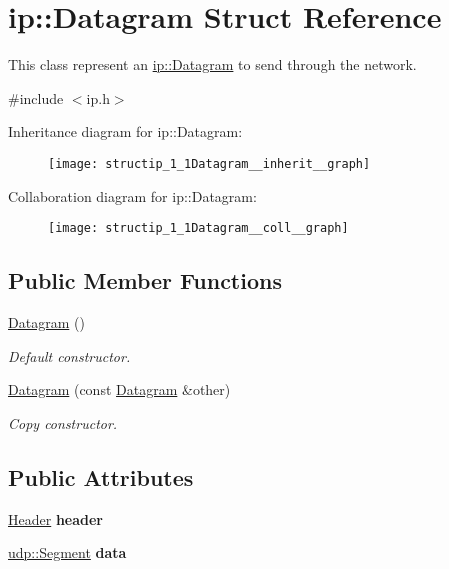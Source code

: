 \hypertarget{structip_1_1Datagram}{}\section{ip\+:\+:Datagram Struct Reference}
\label{structip_1_1Datagram}


This class represent an \hyperlink{structip_1_1Datagram}{ip\+::\+Datagram} to send through the network.  




{\ttfamily \#include $<$ip.\+h$>$}



Inheritance diagram for ip\+:\+:Datagram\+:\nopagebreak
\begin{figure}[H]
\begin{center}
\leavevmode
\texttt{[image: structip\_1\_1Datagram\_\_inherit\_\_graph]}
\end{center}
\end{figure}


Collaboration diagram for ip\+:\+:Datagram\+:\nopagebreak
\begin{figure}[H]
\begin{center}
\leavevmode
\texttt{[image: structip\_1\_1Datagram\_\_coll\_\_graph]}
\end{center}
\end{figure}
\subsection*{Public Member Functions}
\begin{DoxyCompactItemize}
\item 
\hyperlink{structip_1_1Datagram_a22c9da8b488b020705bf92f0d5e2f88f}{Datagram} ()
\begin{DoxyCompactList}\small\item\em Default constructor. \end{DoxyCompactList}\item 
\hyperlink{structip_1_1Datagram_a9b701e9ceeeacc10ae5df56bccde8f51}{Datagram} (const \hyperlink{structip_1_1Datagram}{Datagram} \&other)
\begin{DoxyCompactList}\small\item\em Copy constructor. \end{DoxyCompactList}\end{DoxyCompactItemize}
\subsection*{Public Attributes}
\begin{DoxyCompactItemize}
\item 
\hyperlink{structip_1_1Header}{Header} {\bfseries header}\hypertarget{structip_1_1Datagram_ab2f6057ca4c00b3c1d9637a5e7b6c144}{}\label{structip_1_1Datagram_ab2f6057ca4c00b3c1d9637a5e7b6c144}

\item 
\hyperlink{structudp_1_1Segment}{udp\+::\+Segment} {\bfseries data}\hypertarget{structip_1_1Datagram_a4de3ad46fa81bc6d312c2e77321e59d1}{}\label{structip_1_1Datagram_a4de3ad46fa81bc6d312c2e77321e59d1}

\end{DoxyCompactItemize}


